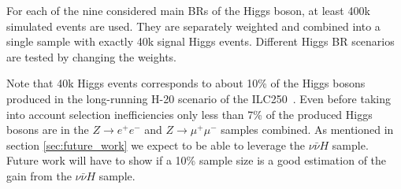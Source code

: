 \documentclass[11pt, hidelinks, a4paper]{scrartcl}
\begin{document}
For each of the nine considered main BRs of the Higgs boson,
at least 400k simulated events are used.
They are separately weighted and combined into a single sample
with exactly 40k signal Higgs events.
Different Higgs BR scenarios are tested by changing the weights.

Note that 40k Higgs events corresponds to about 10\% of the Higgs bosons
produced in the long-running H-20 scenario of the ILC250~\cite{ILC_Scenarios}.
Even before taking into account selection inefficiencies
only less than 7\% of the produced Higgs bosons
are in the $Z \to e^+ e^-$ and $Z \to \mu^+ \mu^-$ samples combined.
As mentioned in section \ref{sec:future_work}
we expect to be able to leverage the $\nu \bar{\nu} H$ sample.
Future work will have to show if a 10\% sample size
is a good estimation of the gain from the $\nu \bar{\nu} H$ sample.
\end{document}

